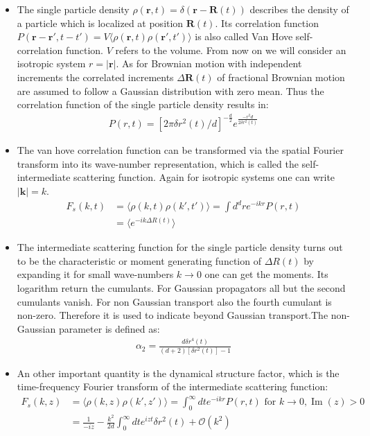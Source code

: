 \documentclass[
  a4paper,BCOR10mm,oneside,
  bibtotoc,idxtotoc,
  headsepline,footsepline,%
  fleqn,openbib
]{scrbook}
\begin{document}
\begin{itemize}
 \item The single particle density $\rho(\bm{r},t)=\delta(\bm{r}-\bm{R}(t))$ describes the density of a particle which is localized at position $\bm{R}(t)$. Its correlation function $P(\bm{r}-\bm{r}',t-t')= V\langle\rho(\bm{r},t) \rho(\bm{r}',t')\rangle$ is also called Van Hove self-correlation function. $V$ refers to the volume. From now on we will consider an isotropic system $ r= |\bm{r}|$. As for Brownian motion with independent increments the correlated increments  $\Delta\bm{R}(t)$ of fractional Brownian motion are assumed to follow a Gaussian distribution with zero mean. Thus the correlation function of the single particle density results in:
\begin{align}
 P(r,t)=[2 \pi \delta r^{2}(t)/d]^{-\frac{d}{2}} e^{ \frac{-r^2 d}{2 \delta r^{2}(t) }}
\end{align}

\item The van hove correlation function can be transformed via the spatial Fourier transform into its wave-number representation, which is called the self-intermediate scattering function. Again for isotropic systems one can write $|\bm{k}|=k$.
\begin{align}
 F_{s}(k,t)&=\langle\rho(k,t) \rho(k',t')\rangle=\int d^{d}r e^{-i k r} P(r,t) \\
 &=\langle e^{-i k \Delta R(t)} \rangle
\end{align}
\item 
The intermediate scattering function for the single particle density turns out to be the characteristic or moment generating function of $\Delta R(t)$ by expanding it for small wave-numbers $k \rightarrow 0$ one can get the moments. Its logarithm return the cumulants. For Gaussian propagators all but the second cumulants vanish. For non Gaussian transport also the fourth cumulant is non-zero. Therefore it is used to indicate beyond Gaussian transport.The non-Gaussian parameter is defined as:
\begin{align}
 \alpha_2=\frac{d \delta r^{4}(t)}{(d+2) [\delta r^{2}(t)]-1}
\end{align}
\item
An other important quantity is the dynamical structure factor, which is the time-frequency Fourier transform of the intermediate scattering function:
\begin{align}
 F_{s}(k,z)&=\langle\rho(k,z) \rho(k',z')\rangle=\int_{0}^{\infty} d t e^{-i k r} P(r,t) \text{ for } k \rightarrow 0 , \operatorname{Im}(z) > 0 \\
 &= \frac{1}{-iz}-\frac{k^2}{2d}\int_{0}^{\infty} d t e^{izt} \delta r^2 (t) + \mathcal{O}(k^2)
\end{align}
\end{itemize}
\end{document}
